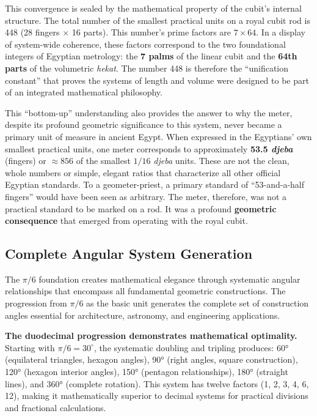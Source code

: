 \documentclass[11pt]{article}
\begin{document}
This convergence is sealed by the mathematical property of the cubit's internal structure. The total number of the smallest practical units on a royal cubit rod is 448 (28 fingers $\times$ 16 parts). This number's prime factors are $7 \times 64$. In a display of system-wide coherence, these factors correspond to the two foundational integers of Egyptian metrology: the \textbf{7 palms} of the linear cubit and the \textbf{64th parts} of the volumetric \textit{hekat}. The number 448 is therefore the ``unification constant'' that proves the systems of length and volume were designed to be part of an integrated mathematical philosophy.

This ``bottom-up'' understanding also provides the answer to why the meter, despite its profound geometric significance to this system, never became a primary unit of measure in ancient Egypt. When expressed in the Egyptians' own smallest practical units, one meter corresponds to approximately \textbf{53.5 \textit{djeba}} (fingers) or \textbf{$\approx856$} of the smallest $1/16$ \textit{djeba} units. These are not the clean, whole numbers or simple, elegant ratios that characterize all other official Egyptian standards. To a geometer-priest, a primary standard of ``53-and-a-half fingers'' would have been seen as arbitrary. The meter, therefore, was not a practical standard to be marked on a rod. It was a profound \textbf{geometric consequence} that emerged from operating with the royal cubit.

\subsection{Complete Angular System Generation}

The $\pi/6$ foundation creates mathematical elegance through systematic angular relationships that encompass all fundamental geometric constructions. The progression from $\pi/6$ as the basic unit generates the complete set of construction angles essential for architecture, astronomy, and engineering applications.

\textbf{The duodecimal progression demonstrates mathematical optimality.} Starting with $\pi/6 = 30^\circ$, the systematic doubling and tripling produces: 60° (equilateral triangles, hexagon angles), 90° (right angles, square construction), 120° (hexagon interior angles), 150° (pentagon relationships), 180° (straight lines), and 360° (complete rotation). This system has twelve factors (1, 2, 3, 4, 6, 12), making it mathematically superior to decimal systems for practical divisions and fractional calculations.
\end{document}
